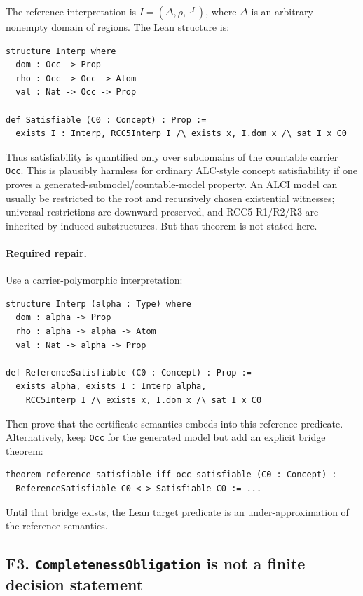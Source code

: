 \documentclass[11pt]{article}
\begin{document}
The reference interpretation is \(I=(\Delta,\rho,\cdot^I)\), where
\(\Delta\) is an arbitrary nonempty domain of regions.  The Lean structure is:

\begin{lstlisting}
structure Interp where
  dom : Occ -> Prop
  rho : Occ -> Occ -> Atom
  val : Nat -> Occ -> Prop

def Satisfiable (C0 : Concept) : Prop :=
  exists I : Interp, RCC5Interp I /\ exists x, I.dom x /\ sat I x C0
\end{lstlisting}

Thus satisfiability is quantified only over subdomains of the countable carrier
\texttt{Occ}.  This is plausibly harmless for ordinary ALC-style concept
satisfiability if one proves a generated-submodel/countable-model property.  An
ALCI model can usually be restricted to the root and recursively chosen
existential witnesses; universal restrictions are downward-preserved, and RCC5
R1/R2/R3 are inherited by induced substructures.  But that theorem is not
stated here.

\paragraph{Required repair.}
Use a carrier-polymorphic interpretation:

\begin{lstlisting}
structure Interp (alpha : Type) where
  dom : alpha -> Prop
  rho : alpha -> alpha -> Atom
  val : Nat -> alpha -> Prop

def ReferenceSatisfiable (C0 : Concept) : Prop :=
  exists alpha, exists I : Interp alpha,
    RCC5Interp I /\ exists x, I.dom x /\ sat I x C0
\end{lstlisting}

Then prove that the certificate semantics embeds into this reference predicate.
Alternatively, keep \texttt{Occ} for the generated model but add an explicit
bridge theorem:

\begin{lstlisting}
theorem reference_satisfiable_iff_occ_satisfiable (C0 : Concept) :
  ReferenceSatisfiable C0 <-> Satisfiable C0 := ...
\end{lstlisting}

Until that bridge exists, the Lean target predicate is an under-approximation
of the reference semantics.

\subsection{F3. \texttt{CompletenessObligation} is not a finite decision statement}
\end{document}
